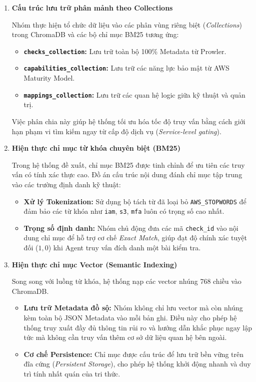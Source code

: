 \begin{enumerate}
    \item \textbf{Cấu trúc lưu trữ phân mảnh theo Collections}

    Nhóm thực hiện tổ chức dữ liệu vào các phân vùng riêng biệt (\textit{Collections}) trong ChromaDB và các bộ chỉ mục BM25 tương ứng:
    \begin{itemize}
        \item \textbf{\texttt{checks\_collection}:} Lưu trữ toàn bộ 100\% Metadata từ Prowler.
        \item \textbf{\texttt{capabilities\_collection}:} Lưu trữ các năng lực bảo mật từ AWS Maturity Model.
        \item \textbf{\texttt{mappings\_collection}:} Lưu trữ các quan hệ logic giữa kỹ thuật và quản trị.
    \end{itemize}
    Việc phân chia này giúp hệ thống tối ưu hóa tốc độ truy vấn bằng cách giới hạn phạm vi tìm kiếm ngay từ cấp độ dịch vụ (\textit{Service-level gating}).

    \item \textbf{Hiện thực chỉ mục từ khóa chuyên biệt (BM25)}

    Trong hệ thống đề xuất, chỉ mục BM25 được tinh chỉnh để ưu tiên các truy vấn có tính xác thực cao. Đồ án cấu trúc nội dung đánh chỉ mục tập trung vào các trường định danh kỹ thuật:
    \begin{itemize}
        \item \textbf{Xử lý Tokenization:} Sử dụng bộ tách từ đã loại bỏ \texttt{AWS\_STOPWORDS} để đảm bảo các từ khóa như \texttt{iam}, \texttt{s3}, \texttt{mfa} luôn có trọng số cao nhất.
        \item \textbf{Trọng số định danh:} Nhóm chủ động đưa các mã \texttt{check\_id} vào nội dung chỉ mục để hỗ trợ cơ chế \textit{Exact Match}, giúp đạt độ chính xác tuyệt đối ($1{,}0$) khi Agent truy vấn đích danh một bài kiểm tra.
    \end{itemize}

    \item \textbf{Hiện thực chỉ mục Vector (Semantic Indexing)}

    Song song với luồng từ khóa, hệ thống nạp các vector nhúng 768 chiều vào ChromaDB.
    \begin{itemize}
        \item \textbf{Lưu trữ Metadata đồ sộ:} Nhóm không chỉ lưu vector mà còn nhúng kèm toàn bộ JSON Metadata vào mỗi bản ghi. Điều này cho phép hệ thống truy xuất đầy đủ thông tin rủi ro và hướng dẫn khắc phục ngay lập tức mà không cần truy vấn thêm cơ sở dữ liệu quan hệ bên ngoài.
        \item \textbf{Cơ chế Persistence:} Chỉ mục được cấu trúc để lưu trữ bền vững trên đĩa cứng (\textit{Persistent Storage}), cho phép hệ thống khởi động nhanh và duy trì tính nhất quán của tri thức.
    \end{itemize}


\end{enumerate}

